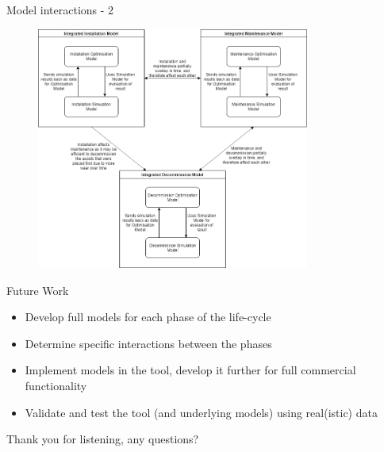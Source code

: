 \documentclass{beamer}
\begin{document}
\begin{frame}{Model interactions - 2}
\begin{figure}[t]
  \includegraphics[width=0.8\textwidth]{flowchart}
\centering
\end{figure}
\end{frame}


\begin{frame}{Future Work}
   \begin{itemize}
  	\item Develop full models for each phase of the life-cycle
  	\item Determine specific interactions between the phases
  	\item Implement models in the tool, develop it further for full commercial functionality
  	\item Validate and test the tool (and underlying models) using real(istic) data
  \end{itemize}
  \pause
  \bigskip
  \begin{center}
  Thank you for listening, any questions?
  \end{center}
\end{frame}
\end{document}
